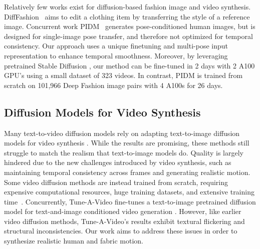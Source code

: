         Relatively few works exist for diffusion-based fashion image and video synthesis. DiffFashion~\cite{DiffFashion} aims to edit a clothing item by transferring the style of a reference image. Concurrent work PIDM~\cite{pose-transfer-dm} generates pose-conditioned human images, but is designed for single-image pose transfer, and therefore not optimized for temporal consistency. Our approach uses a unique finetuning and multi-pose input representation to enhance temporal smoothness. Moreover, by leveraging pretrained Stable Diffusion \cite{stable_diffusion}, our method can be fine-tuned in 2 days with 2 A100 GPU's using a small dataset of 323 videos. In contrast, PIDM \cite{pose-transfer-dm} is
        trained from scratch on 101,966 Deep Fashion \cite{deep-fashion} image pairs with 4 A100s for 26 days. %

    
    \subsection{Diffusion Models for Video Synthesis}
        Many text-to-video diffusion models rely on adapting text-to-image diffusion models for video synthesis \cite{flexible-diffusion-modeling,latent_vdm,imagen_video,video-diffusion-models,make-a-video,ddpm_video}. While the results are promising, these methods still struggle to match the realism that text-to-image models do. Quality is largely hindered due to the new challenges introduced by video synthesis, such as maintaining temporal consistency across frames and generating realistic motion. Some video diffusion methods are instead trained from scratch, requiring expensive computational resources, huge training datasets, and extensive training time~\cite{imagen_video,video-diffusion-models,dream_fusion,dalle2,dreamix, latent_vdm}. %
        Concurrently, Tune-A-Video fine-tunes a text-to-image pretrained diffusion model for text-and-image conditioned video generation \cite{tune-a-video}. However, like earlier video diffusion methods, Tune-A-Video's results exhibit textural flickering and structural inconsistencies. Our work aims to address these issues in order to synthesize realistic human and fabric motion.

